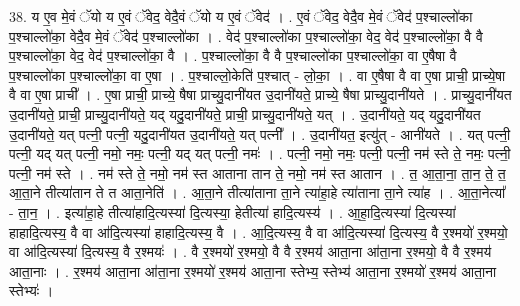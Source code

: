 \documentclass[17pt]{extarticle}
\begin{document}
38. य ए॒व मे॒वं ॅयो य ए॒वं ॅवेद॒ वेदै॒वं ॅयो य ए॒वं ॅवेद॑ । . ए॒वं ॅवेद॒ वेदै॒व मे॒वं ॅवेद॑ प॒श्चाल्लो॑का प॒श्चाल्लो॑का॒ वेदै॒व मे॒वं ॅवेद॑ प॒श्चाल्लो॑का । . वेद॑ प॒श्चाल्लो॑का प॒श्चाल्लो॑का॒ वेद॒ वेद॑ प॒श्चाल्लो॑का॒ वै वै प॒श्चाल्लो॑का॒ वेद॒ वेद॑ प॒श्चाल्लो॑का॒ वै । . प॒श्चाल्लो॑का॒ वै वै प॒श्चाल्लो॑का प॒श्चाल्लो॑का॒ वा ए॒षैषा वै प॒श्चाल्लो॑का प॒श्चाल्लो॑का॒ वा ए॒षा । . प॒श्चाल्लो॒केति॑ प॒श्चात् - लो॒का॒ । . वा ए॒षैषा वै वा ए॒षा प्राची॒ प्राच्ये॒षा वै वा ए॒षा प्राची᳚ । . ए॒षा प्राची॒ प्राच्ये॒ षैषा प्राच्यु॒दानी॑यत उ॒दानी॑यते॒ प्राच्ये॒ षैषा प्राच्यु॒दानी॑यते । . प्राच्यु॒दानी॑यत उ॒दानी॑यते॒ प्राची॒ प्राच्यु॒दानी॑यते॒ यद् यदु॒दानी॑यते॒ प्राची॒ प्राच्यु॒दानी॑यते॒ यत् । . उ॒दानी॑यते॒ यद् यदु॒दानी॑यत उ॒दानी॑यते॒ यत् पत्नी॒ पत्नी॒ यदु॒दानी॑यत उ॒दानी॑यते॒ यत् पत्नी᳚ । . उ॒दानी॑यत॒ इत्यु॑त् - आनी॑यते । . यत् पत्नी॒ पत्नी॒ यद् यत् पत्नी॒ नमो॒ नमः॒ पत्नी॒ यद् यत् पत्नी॒ नमः॑ । . पत्नी॒ नमो॒ नमः॒ पत्नी॒ पत्नी॒ नम॑ स्ते ते॒ नमः॒ पत्नी॒ पत्नी॒ नम॑ स्ते । . नम॑ स्ते ते॒ नमो॒ नम॑ स्त आताना तान ते॒ नमो॒ नम॑ स्त आतान । . त॒ आ॒ता॒ना॒ ता॒न॒ ते॒ त॒ आ॒ता॒ने तीत्या॑तान ते त आता॒नेति॑ । . आ॒ता॒ने तीत्या॑ताना ता॒ने त्या॑हा॒हे त्या॑ताना ता॒ने त्या॑ह । . आ॒ता॒नेत्या᳚ - ता॒न॒ । . इत्या॑हा॒हे तीत्या॑हादि॒त्यस्या॑ दि॒त्यस्या॒ हेतीत्या॑ हादि॒त्यस्य॑ । . आ॒हा॒दि॒त्यस्या॑ दि॒त्यस्या॑ हाहादि॒त्यस्य॒ वै वा आ॑दि॒त्यस्या॑ हाहादि॒त्यस्य॒ वै । . आ॒दि॒त्यस्य॒ वै वा आ॑दि॒त्यस्या॑ दि॒त्यस्य॒ वै र॒श्मयो॑ र॒श्मयो॒ वा आ॑दि॒त्यस्या॑ दि॒त्यस्य॒ वै र॒श्मयः॑ । . वै र॒श्मयो॑ र॒श्मयो॒ वै वै र॒श्मय॑ आता॒ना आ॑ता॒ना र॒श्मयो॒ वै वै र॒श्मय॑ आता॒नाः । . र॒श्मय॑ आता॒ना आ॑ता॒ना र॒श्मयो॑ र॒श्मय॑ आता॒ना स्तेभ्य॒ स्तेभ्य॑ आता॒ना र॒श्मयो॑ र॒श्मय॑ आता॒ना स्तेभ्यः॑ । \newline
\pagebreak
{}
\end{document}
